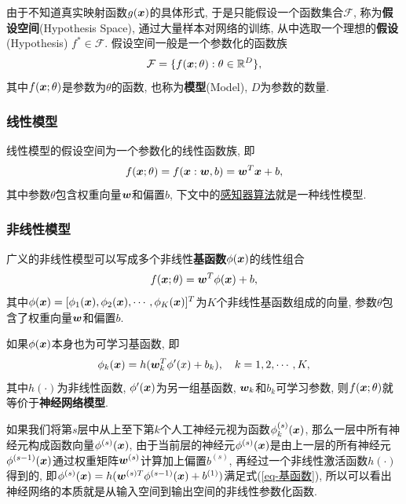 \documentclass[12pt, a4paper, oneside]{ctexart}
\begin{document}
由于不知道真实映射函数$g(\boldsymbol{x})$的具体形式, 于是只能假设一个函数集合$\mathcal{F}$, 称为\textbf{假设空间}(Hypothesis Space), 通过大量样本对网络的训练, 从中选取一个理想的\textbf{假设}(Hypothesis) $f^*\in \mathcal{F}$. 假设空间一般是一个参数化的函数族
\begin{equation}
    \mathcal{F} = \{f(\boldsymbol{x}; \theta):\theta\in \mathbb{R}^D\},
\end{equation}
其中$f(\boldsymbol{x};\theta)$是参数为$\theta$的函数, 也称为\textbf{模型}(Model), $D$为参数的数量.

\subsubsection{线性模型}
线性模型的假设空间为一个参数化的线性函数族, 即
\begin{equation}
    f(\boldsymbol{x};\theta) = f(\boldsymbol{x}:\boldsymbol{w}, b) = \boldsymbol{w}^T\boldsymbol{x}+b,
\end{equation}
其中参数$\theta$包含权重向量$\boldsymbol{w}$和偏置$b$, 下文中的\hyperref[section-感知器算法]{感知器算法}就是一种线性模型.

\subsubsection{非线性模型}
广义的非线性模型可以写成多个非线性\textbf{基函数}$\phi(\boldsymbol{x})$的线性组合
\begin{equation}
    f(\boldsymbol{x};\theta) = \boldsymbol{w}^T\phi(\boldsymbol{x})+b,
\end{equation}
其中$\phi(\boldsymbol{x}) = [\phi_1(\boldsymbol{x}),\phi_2(\boldsymbol{x}),\cdots,\phi_K(\boldsymbol{x})]^T$为$K$个非线性基函数组成的向量, 参数$\theta$包含了权重向量$\boldsymbol{w}$和偏置$b$.

如果$\phi(\boldsymbol{x})$本身也为可学习基函数, 即
\begin{equation}\label{eq-基函数}
    \phi_k(\boldsymbol{x}) = h(\boldsymbol{w}_k^T\phi'(x)+b_k),\quad k=1,2,\cdots, K,
\end{equation}
其中$h(\cdot)$为非线性函数, $\phi'(\boldsymbol{x})$为另一组基函数, $\boldsymbol{w}_k$和$b_k$可学习参数, 则$f(\boldsymbol{x}; \theta)$就等价于\textbf{神经网络模型}. 

如果我们将第$s$层中从上至下第$k$个人工神经元视为函数$\phi_k^{(s)}(\boldsymbol{x})$, 那么一层中所有神经元构成函数向量$\phi^{(s)}(\boldsymbol{x})$, 由于当前层的神经元$\phi^{(s)}(\boldsymbol{x})$是由上一层的所有神经元$\phi^{(s-1)}(\boldsymbol{x})$通过权重矩阵$\boldsymbol{w}^{(s)}$计算加上偏置$b^{(s)}$, 再经过一个非线性激活函数$h(\cdot)$得到的, 即$\phi^{(s)}(\boldsymbol{x}) = h(\boldsymbol{w}^{(s)T}\phi^{(s-1)}(\boldsymbol{x})+b^{(1)})$满足式(\ref{eq-基函数}), 所以可以看出神经网络的本质就是从输入空间到输出空间的非线性参数化函数.
\end{document}
